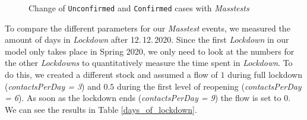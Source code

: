 \documentclass
[
    report,
    11pt,
    bibliography = totoc,
    listof = totoc,
    headinclude = true,
]
{scrreport}
\begin{document}
\begin{figure}[!h]
  \centering
  \qquad
  \caption{Change of \texttt{Unconfirmed} and \texttt{Confirmed} cases with \textit{Masstests}}%
  \label{uncon&con}
\end{figure}



To compare the different parameters for our \textit{Masstest} events, we measured the amount of days in \textit{Lockdown} after 12.\,12.\,2020. Since the first \textit{Lockdown} in our model only
takes place in Spring 2020, we only need to look at the numbers for the other \textit{Lockdowns}
to quantitatively measure the time spent in \textit{Lockdown}.
To do this, we created a different stock and assumed a flow of $1$ during full lockdown
(\textit{contactsPerDay = 3}) and $0.5$ during the first level of reopening
(\textit{contactsPerDay = 6}). As soon as the lockdown ends (\textit{contactsPerDay = 9})
the flow is set to 0. We can see the results in Table \ref{days_of_lockdown}.
\end{document}
